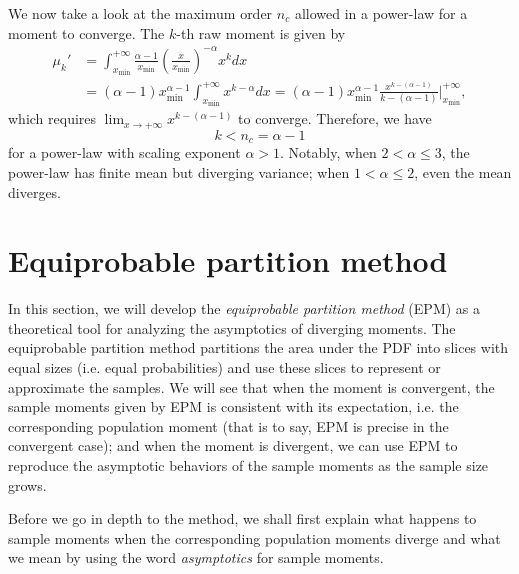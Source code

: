 We now take a look at the maximum order $ n_c $  allowed in a power-law for a moment to converge. The $ k $-th raw moment is given by 
\begin{align*}
\mu_{k}' &= \int_{x_{\min}}^{+\infty} \frac{\alpha-1}{x_{\min}} (\frac{x}{x_{\min}})^{-\alpha} x^k dx \\
&= (\alpha-1) x_{\min}^{\alpha-1} \int_{x_{\min}}^{+\infty} x^{k-\alpha} dx = (\alpha-1) x_{\min}^{\alpha-1} \frac{x^{k-(\alpha-1)}}{k-(\alpha-1)} \Bigg|_{x_{\min}}^{+\infty},
\end{align*}
which requires $ \lim_{x \rightarrow +\infty} x^{k-(\alpha-1)} $ to converge. Therefore, we have 
\begin{equation}
k < n_c = \alpha -1
\end{equation}
for a power-law with scaling exponent $ \alpha >1 $. Notably, when $ 2 < \alpha \leq 3 $, the power-law has finite mean but diverging variance; when $ 1 < \alpha \leq 2 $, even the mean diverges.  

\section{Equiprobable partition method}
In this section, we will develop the \textit{equiprobable partition method} (EPM) as a theoretical tool for analyzing the asymptotics of diverging moments. The equiprobable partition method partitions the area under the PDF into slices with equal sizes (i.e. equal probabilities) and use these slices to represent or approximate the samples. We will see that when the moment is convergent, the sample moments given by EPM is consistent with its expectation, i.e. the corresponding population moment (that is to say, EPM is precise in the convergent case); and when the moment is divergent, we can use EPM to reproduce the asymptotic behaviors of the sample moments as the sample size grows. 

Before we go in depth to the method, we shall first explain what happens to sample moments when the corresponding population moments diverge and what we mean by using the word \textit{asymptotics} for sample moments. 

